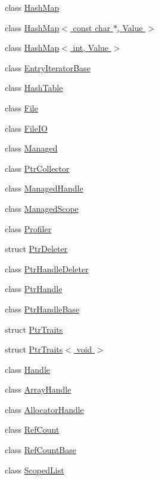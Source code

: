 \begin{DoxyCompactItemize}
\item 
class \hyperlink{classmocha_1_1_hash_map}{HashMap}
\item 
class \hyperlink{classmocha_1_1_hash_map_3_01const_01char_01_5_00_01_value_01_4}{HashMap$<$ const char $\ast$, Value $>$}
\item 
class \hyperlink{classmocha_1_1_hash_map_3_01int_00_01_value_01_4}{HashMap$<$ int, Value $>$}
\item 
class \hyperlink{classmocha_1_1_entry_iterator_base}{EntryIteratorBase}
\item 
class \hyperlink{classmocha_1_1_hash_table}{HashTable}
\item 
class \hyperlink{classmocha_1_1_file}{File}
\item 
class \hyperlink{classmocha_1_1_file_i_o}{FileIO}
\item 
class \hyperlink{classmocha_1_1_managed}{Managed}
\item 
class \hyperlink{classmocha_1_1_ptr_collector}{PtrCollector}
\item 
class \hyperlink{classmocha_1_1_managed_handle}{ManagedHandle}
\item 
class \hyperlink{classmocha_1_1_managed_scope}{ManagedScope}
\item 
class \hyperlink{classmocha_1_1_profiler}{Profiler}
\item 
struct \hyperlink{structmocha_1_1_ptr_deleter}{PtrDeleter}
\item 
class \hyperlink{classmocha_1_1_ptr_handle_deleter}{PtrHandleDeleter}
\item 
class \hyperlink{classmocha_1_1_ptr_handle}{PtrHandle}
\item 
class \hyperlink{classmocha_1_1_ptr_handle_base}{PtrHandleBase}
\item 
struct \hyperlink{structmocha_1_1_ptr_traits}{PtrTraits}
\item 
struct \hyperlink{structmocha_1_1_ptr_traits_3_01void_01_4}{PtrTraits$<$ void $>$}
\item 
class \hyperlink{classmocha_1_1_handle}{Handle}
\item 
class \hyperlink{classmocha_1_1_array_handle}{ArrayHandle}
\item 
class \hyperlink{classmocha_1_1_allocator_handle}{AllocatorHandle}
\item 
class \hyperlink{classmocha_1_1_ref_count}{RefCount}
\item 
class \hyperlink{classmocha_1_1_ref_count_base}{RefCountBase}
\item 
class \hyperlink{classmocha_1_1_scoped_list}{ScopedList}

\end{DoxyCompactItemize}
